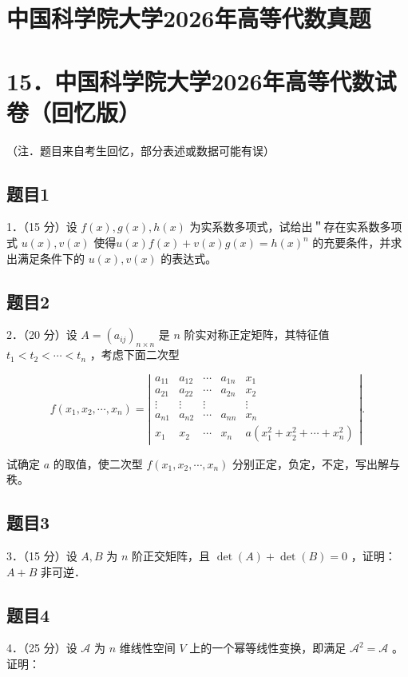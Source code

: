 \documentclass{article}
\begin{document}
\section*{中国科学院大学2026年高等代数真题}
\section*{15．中国科学院大学2026年高等代数试卷（回忆版）}
（注．题目来自考生回忆，部分表述或数据可能有误）

\subsection{题目1}
1．（15 分）设 \(f(x), g(x), h(x)\) 为实系数多项式，试给出＂存在实系数多项式 \(u(x), v(x)\) 使得\(u(x) f(x)+v(x) g(x)=h(x)^{n}\) 的充要条件，并求出满足条件下的 \(u(x), v(x)\) 的表达式。

\subsection{题目2}
2．（20 分）设 \(A=\left(a_{i j}\right)_{n \times n}\) 是 \(n\) 阶实对称正定矩阵，其特征值 \(t_{1}<t_{2}<\cdots<t_{n}\) ，考虑下面二次型

\[
f\left(x_{1}, x_{2}, \cdots, x_{n}\right)=\left|\begin{array}{ccccc}
a_{11} & a_{12} & \cdots & a_{1 n} & x_{1} \\
a_{21} & a_{22} & \cdots & a_{2 n} & x_{2} \\
\vdots & \vdots & \vdots & & \vdots \\
a_{n 1} & a_{n 2} & \cdots & a_{n n} & x_{n} \\
x_{1} & x_{2} & \cdots & x_{n} & a\left(x_{1}^{2}+x_{2}^{2}+\cdots+x_{n}^{2}\right)
\end{array}\right| .
\]

试确定 \(a\) 的取值，使二次型 \(f\left(x_{1}, x_{2}, \cdots, x_{n}\right)\) 分别正定，负定，不定，写出解与秩。

\subsection{题目3}
3．（15 分）设 \(A, B\) 为 \(n\) 阶正交矩阵，且 \(\operatorname{det}(A)+\operatorname{det}(B)=0\) ，证明：\(A+B\) 非可逆．

\subsection{题目4}
4．（25 分）设 \(\mathcal{A}\) 为 \(n\) 维线性空间 \(V\) 上的一个幂等线性变换，即满足 \(\mathcal{A}^{2}=\mathcal{A}\) 。证明：
\end{document}
